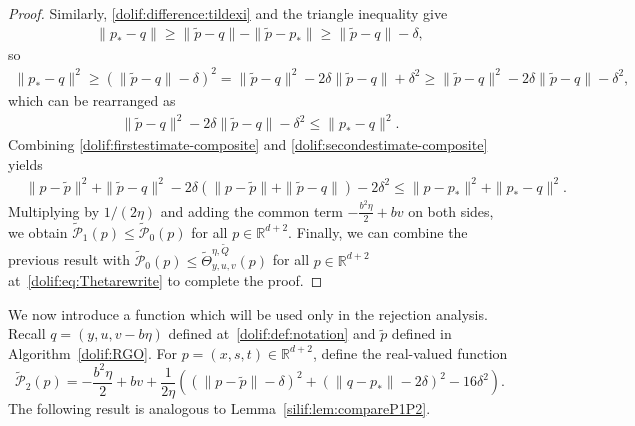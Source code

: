 \documentclass[11pt,letterpaper]{article}
\newcommand{\R}{\mathbb{R}}
\newcommand{\Q}{\widetilde{Q}}
\begin{document}
\begin{proof}
Similarly, \eqref{dolif:difference:tildexi} and the triangle inequality give
\begin{align}
\label{dolif:estimatewihoutsquare-rho}
\| p_*- q\|
\ge \|\tilde{ p}- q\|-\|\tilde{ p}- p_*\|
\ge \|\tilde{ p}- q\|-\delta,
\end{align}
so
\begin{align*}
\| p_*- q\|^2
\ge \left(\|\tilde{ p}- q\|-\delta\right)^2
= \|\tilde{ p}- q\|^2-2\delta\|\tilde{ p}- q\|+\delta^2
\ge \|\tilde{ p}- q\|^2-2\delta\|\tilde{ p}- q\|-\delta^2,
\end{align*}
which can be rearranged as
\begin{align}
\label{dolif:secondestimate-composite}
\|\tilde{ p}- q\|^2-2\delta\|\tilde{ p}- q\|-\delta^2
\le \| p_*- q\|^2.
\end{align}
Combining \eqref{dolif:firstestimate-composite} and \eqref{dolif:secondestimate-composite} yields
\begin{align*}
&\| p-\tilde{ p}\|^2+\|\tilde{ p}- q\|^2
-2\delta\left(\| p-\tilde{ p}\|+\|\tilde{ p}- q\|\right)
-2\delta^2\le \| p- p_*\|^2+\| p_*- q\|^2.
\end{align*}
Multiplying by $1/(2\eta)$ and adding the common term $-\frac{b^2\eta}{2}+bv$ on both sides, we obtain
$\widetilde{\mathcal{P}}_1( p)\le \widetilde{\mathcal{P}}_0( p)$ for all $ p\in\mathbb{R}^{d+2}$. Finally, we can combine the previous result with $\widetilde{\mathcal{P}}_0( p)\le \widetilde{\Theta}_{y,u,v}^{\eta,\Q}( p)$ for all $ p\in\mathbb{R}^{d+2}$ at~\eqref{dolif:eq:Thetarewrite} to complete the proof. 
\end{proof}





We now introduce a function which will be used
only in the rejection analysis. Recall $q=(y,u,v-b\eta)$ defined at~\eqref{dolif:def:notation} and $\tilde p$ defined in Algorithm~\ref{dolif:RGO}. For $p=(x,s,t)\in \R^{d+2}$, define the real-valued function 
\begin{equation}\label{dolif:def:P2}
  \widetilde{\mathcal{P}}_2( p)
  = -\frac{b^2\eta}{2} + b v
     + \frac{1}{2\eta}\left(
        \left(\| p-\tilde p\| - \delta\right)^2
        + \left(\| q- p_*\| - 2\delta\right)^2
        - 16\delta^2
     \right). 
\end{equation}
The following result is analogous to Lemma~\ref{silif:lem:compareP1P2}.
\end{document}
